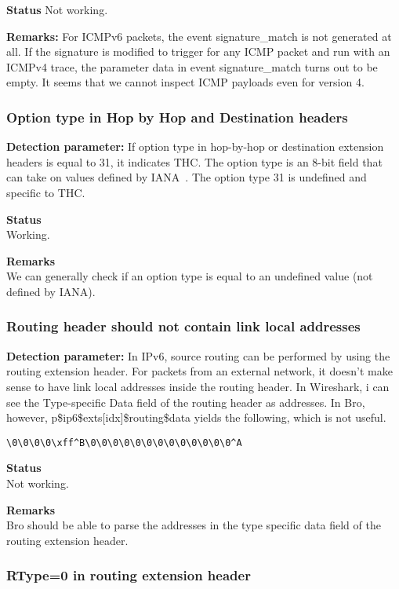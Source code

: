 \documentclass{article}
\begin{document}
\textbf{Status}
Not working.

\textbf{Remarks:} 
For ICMPv6 packets, the event signature\_match is not generated at all.
If the signature is modified to trigger for any ICMP packet and run with
	an ICMPv4 trace, the parameter data in event signature\_match turns out 
	to be empty. It seems that we cannot inspect ICMP payloads even for version 4.

\subsubsection{Option type in Hop by Hop and Destination headers }

\textbf{Detection parameter:}
If option type in hop-by-hop or destination extension headers is 
	equal to 31, it indicates THC. The option type is an 8-bit field
	that can take on values defined by IANA~\cite{iana-parameters-ipv6}.
The option type 31 is undefined and specific to THC.
	 
\textbf{Status}\\
Working.

\textbf{Remarks}\\
We can generally check if an option type is equal to
	an undefined value (not defined by IANA).
	
\subsubsection{Routing header should not contain link local addresses}

\textbf{Detection parameter:}
In IPv6, source routing can be performed by using the routing
	extension header.
For packets from an external network, it doesn't make sense
	to have link local addresses inside the routing header.
In Wireshark, i can see the Type-specific Data field of the routing header
	as addresses. 
In Bro, however, p\$ip6\$exts[idx]\$routing\$data yields the following,
	which is not useful.

\begin{verbatim}
\0\0\0\0\xff^B\0\0\0\0\0\0\0\0\0\0\0\0\0^A 
\end{verbatim}

	 
\textbf{Status}\\
Not working.

\textbf{Remarks}\\
Bro should be able to parse the addresses in the type specific data field
	of the routing extension header.
	
\subsubsection{RType=0 in routing extension header}
\end{document}
